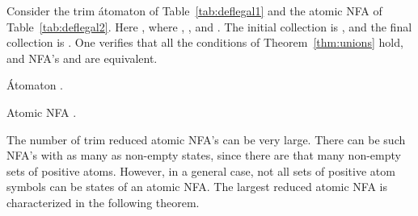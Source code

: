 \documentclass{llncs}
\newcommand{\qedb}{\hfill}
\begin{document}
\begin{example}
\label{ex:atomconstr}
Consider the trim \'atomaton  of Table~\ref{tab:deflegal1} and 
the atomic NFA  of Table~\ref{tab:deflegal2}.
Here , where ,
, and 
.
The initial collection is , and the final
collection is 
.
One verifies that all the conditions of Theorem~\ref{thm:unions} hold,
and  NFA's  and  are equivalent.
\begin{table}[t]
\begin{minipage}[b]{0.37\linewidth}
\caption{\'Atomaton .}
\label{tab:deflegal1}

\end{minipage}
\hspace{.5cm}
\begin{minipage}[b]{0.55\linewidth}
\caption{Atomic NFA .}
\label{tab:deflegal2}

\end{minipage}
\end{table}
\qedb
\end{example}


The number of trim reduced atomic NFA's can be very large. 
There can be such NFA's with as many as  non-empty states, 
since there are that many non-empty sets of positive atoms. 
However, in a general case, not all sets of positive atom symbols can be states of 
an atomic NFA. 
The largest reduced atomic NFA is characterized in the following theorem.
\end{document}
